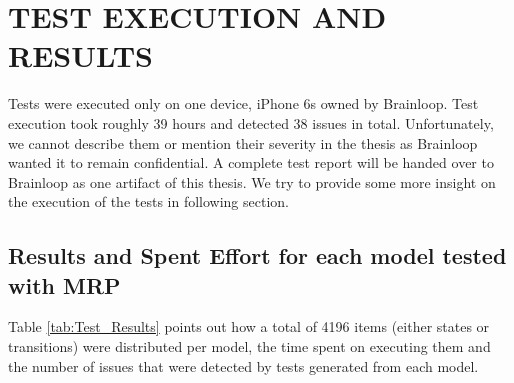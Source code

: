 \chapter{TEST EXECUTION AND RESULTS}
\label{chapter:testing_results}

Tests were executed only on one device, iPhone 6s owned by Brainloop. Test execution took roughly 39 hours and detected 38 issues in total. Unfortunately, we cannot describe them or mention their severity in the thesis as Brainloop wanted it to remain confidential. A complete test report will be handed over to Brainloop as one artifact of this thesis. We try to provide some more insight on the execution of the tests in following section.

\section{Results and Spent Effort for each model tested with MRP}
Table \ref{tab:Test_Results} points out how a total of 4196 items (either states or transitions) were distributed per model, the time spent on executing them and the number of issues that were detected by tests generated from each model.

